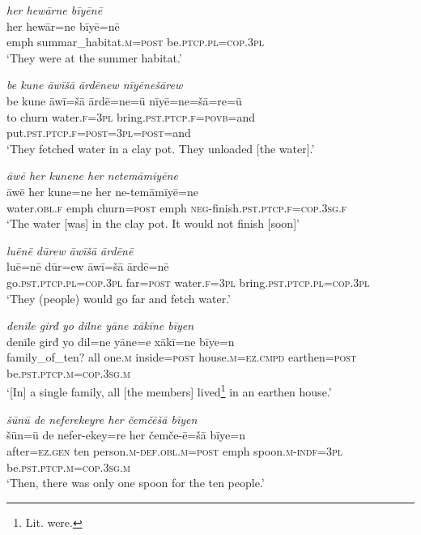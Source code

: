 \ea \label{ŽE.10}
\textit{her hewārne bīyēnē} \\ 
\gll her hewār=ne bīyē=nē \\ 
 emph summar\_habitat\textsc{.m}\textsc{=\textsc{post}} be\textsc{.ptcp}\textsc{.pl}\textsc{=cop}\textsc{.3pl} \\ 
\glt `They were at the summer habitat.'
\z 
 
\ea \label{ŽE.17}
\textit{be kune āwīšā ārdēnew nīyēnešārew} \\ 
\gll be kune āwī=šā ārdē=ne=ū nīyē=ne=šā=re=ū \\ 
 to churn water\textsc{.f}\textsc{=3pl} bring\textsc{.pst}\textsc{.ptcp}\textsc{.f}\textsc{=\textsc{povb}}=and put\textsc{.pst}\textsc{.ptcp}\textsc{.f}\textsc{=\textsc{post}}\textsc{=3pl}\textsc{=\textsc{post}}=and \\ 
\glt `They fetched water in a clay pot. They unloaded [the water].'
\z 
 
\ea \label{ŽE.21}
\textit{āwē her kunene her netemāmīyēne} \\ 
\gll āwē her kune=ne her ne-temāmīyē=ne \\ 
 water\textsc{.obl}\textsc{.f} emph churn\textsc{=\textsc{post}} emph \textsc{neg-}finish\textsc{.pst}\textsc{.ptcp}\textsc{.f}\textsc{=cop}\textsc{.3sg}\textsc{.f} \\ 
\glt `The water [was] in the clay pot. It would not finish [soon]'
\z 
 
\ea \label{ŽE.24}
\textit{luēnē dūrew āwīšā ārdēnē} \\ 
\gll luē=nē dūr=ew āwī=šā ārdē=nē \\ 
 go\textsc{.pst}\textsc{.ptcp}\textsc{.pl}\textsc{=cop}\textsc{.3pl} far\textsc{=\textsc{post}} water\textsc{.f}\textsc{=3pl} bring\textsc{.pst}\textsc{.ptcp}\textsc{.pl}\textsc{=cop}\textsc{.3pl} \\ 
\glt `They (people) would go far and fetch water.'
\z 
 
\ea \label{ŽE.26}
\textit{denīle girđ yo dilne yāne xākīne bīyen} \\ 
\gll denīle girđ yo dil=ne yāne=e xākī=ne bīye=n \\ 
 family\_of\_ten? all one\textsc{.m} inside\textsc{=\textsc{post}} house\textsc{.m}\textsc{=ez}\textsc{.cmpd} earthen\textsc{=\textsc{post}} be\textsc{.pst}\textsc{.ptcp}\textsc{.m}\textsc{=cop}\textsc{.3sg}\textsc{.m} \\ 
\glt `[In] a single family, all [the members] lived\footnote{Lit. were.} in an earthen house.'
\z 
 
\ea \label{ŽE.28}
\textit{šūnū de neferekeyre her čemčēšā bīyen} \\ 
\gll šūn=ū de nefer-ekey=re her čemče-ē=šā bīye=n \\ 
 after\textsc{\textsc{=ez.gen}} ten person\textsc{.m}\textsc{-def}\textsc{.obl}\textsc{.m}\textsc{=\textsc{post}} emph spoon\textsc{.m}\textsc{-indf}\textsc{=3pl} be\textsc{.pst}\textsc{.ptcp}\textsc{.m}\textsc{=cop}\textsc{.3sg}\textsc{.m} \\ 
\glt `Then, there was only one spoon for the ten people.'
\z 
 
